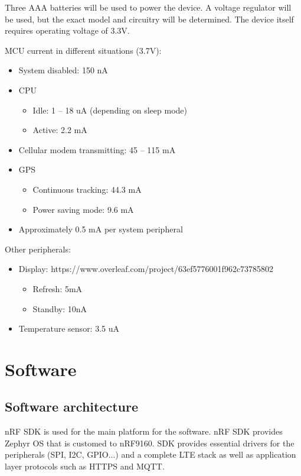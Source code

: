 \documentclass[]{dithesis}
\begin{document}
Three AAA batteries will be used to power the device. A voltage regulator will be used, but the exact model and circuitry will be determined. The device itself requires operating voltage of 3.3V. 

MCU current in different situations (3.7V):
\begin{itemize}
    \item System disabled: 150 nA 
    \item CPU
    \begin{itemize}
        \item Idle: 1 – 18 uA (depending on sleep mode)
        \item Active: 2.2 mA 
    \end{itemize}
    \item Cellular modem transmitting: 45 – 115 mA 
    \item GPS 
    \begin{itemize}
        \item Continuous tracking: 44.3 mA  
        \item Power saving mode: 9.6 mA 
    \end{itemize}
    \item Approximately 0.5 mA per system peripheral 
\end{itemize}

Other peripherals: 
\begin{itemize}
    \item Display: https://www.overleaf.com/project/63ef5776001f962c73785802
    \begin{itemize}
        \item Refresh: 5mA
        \item Standby: 10nA
    \end{itemize}
    \item Temperature sensor: 3.5 uA 
\end{itemize}


\section{Software}

\subsection{Software architecture}

nRF SDK is used for the main platform for the software. nRF SDK provides Zephyr OS that is customed to nRF9160. SDK provides essential drivers for the peripherals (SPI, I2C, GPIO...) and a complete LTE stack as well as application layer protocols such as HTTPS and MQTT.  
\end{document}
